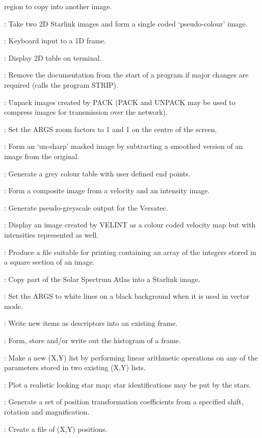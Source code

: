 \begin{description}
region to copy into another image.
\item [TWOTONE]: Take two 2D Starlink images and form a single coded
`pseudo-colour' image.
\item [TYPEIN]: Keyboard input to a 1D frame.
\item [TYPETAB]: Display 2D table on terminal.
\item [UNDOC]: Remove the documentation from the start of a program if major
changes are required (calls the program STRIP).
\item [UNPACK]: Unpack images created by PACK (PACK and UNPACK may be used to
compress images for transmission over the network).
\item [UNZOOM]: Set the ARGS zoom factors to 1 and 1 on the centre of the
screen.
\item [USMASK]: Form an `un-sharp' masked image by subtracting a smoothed
version of an image from the original.
\item [VARGREY]: Generate a grey colour table with user defined end points.
\item [VELINT]: Form a composite image from a velocity and an intensity image.
\item [VERGREY]: Generate pseudo-greyscale output for the Versatec.
\item [VIDISP]: Display an image created by VELINT as a colour coded velocity
map but with intensities represented as well.
\item [VIEW]: Produce a file suitable for printing containing an array of the
integers stored in a square section of an image.
\item [WAVEGET]: Copy part of the Solar Spectrum Atlas into a Starlink image.
\item [WONB]: Set the ARGS to white lines on a black background when it is used
in vector mode.
\item [WRDSCR]: Write new items as descriptors into an existing frame.
\item [WRHIST]: Form, store and/or write out the histogram of a frame.
\item [XYARITH]: Make a new (X,Y) list by performing linear arithmetic
operations on any of the parameters stored in two existing (X,Y) lists.
\item [XYCHART]: Plot a realistic looking star map; star identifications may be
put by the stars.
\item [XYCOEFF]: Generate a set of position transformation coefficients from a
specified shift, rotation and magnification.
\item [XYCUR]: Create a file of (X,Y) positions.

\end{description}
